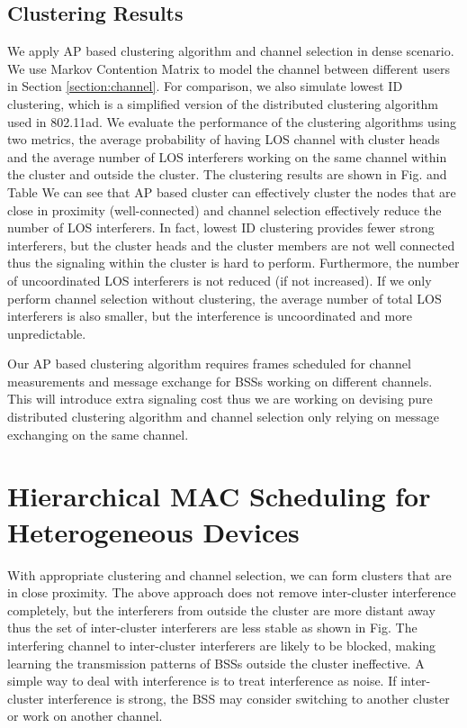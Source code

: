\documentclass[10pt, conference, letterpaper]{IEEEtran}
\begin{document}
\subsection{Clustering Results}\label{subsection:cluster_result}
We apply AP based clustering algorithm and channel selection in dense scenario. We use Markov Contention Matrix to model the channel between different users in Section \ref{section:channel}. For comparison, we also simulate lowest ID clustering, which is a simplified version of the distributed clustering algorithm used in 802.11ad. We evaluate the performance of the clustering algorithms using two metrics, the average probability of having LOS channel with cluster heads and the average number of LOS interferers working on the same channel within the cluster and outside the cluster. The clustering results are shown in Fig. %
and Table %
We can see that AP based cluster can effectively cluster the nodes that are close in proximity (well-connected) and channel selection effectively reduce the number of LOS interferers. In fact, lowest ID clustering provides fewer strong interferers, but the cluster heads and the cluster members are not well connected thus the signaling within the cluster is hard to perform. Furthermore, the number of uncoordinated LOS interferers is not reduced (if not increased). If we only perform channel selection without clustering, the average number of total LOS interferers is also smaller, but the interference is uncoordinated and more unpredictable.

Our AP based clustering algorithm requires frames scheduled for channel measurements and message exchange for BSSs working on different channels. This will introduce extra signaling cost thus we are working on devising pure distributed clustering algorithm and channel selection only relying on message exchanging on the same channel.

\section{Hierarchical MAC Scheduling for Heterogeneous Devices}
With appropriate clustering and channel selection, we can form clusters that are in close proximity. The above approach does not remove inter-cluster interference completely, but the interferers from outside the cluster are more distant away thus the set of inter-cluster interferers are less stable as shown in Fig. %
The interfering channel to inter-cluster interferers are likely to be blocked, making learning the transmission patterns of BSSs outside the cluster ineffective. A simple way to deal with interference is to treat interference as noise. If inter-cluster interference is strong, the BSS may consider switching to another cluster or work on another channel. 
\end{document}
